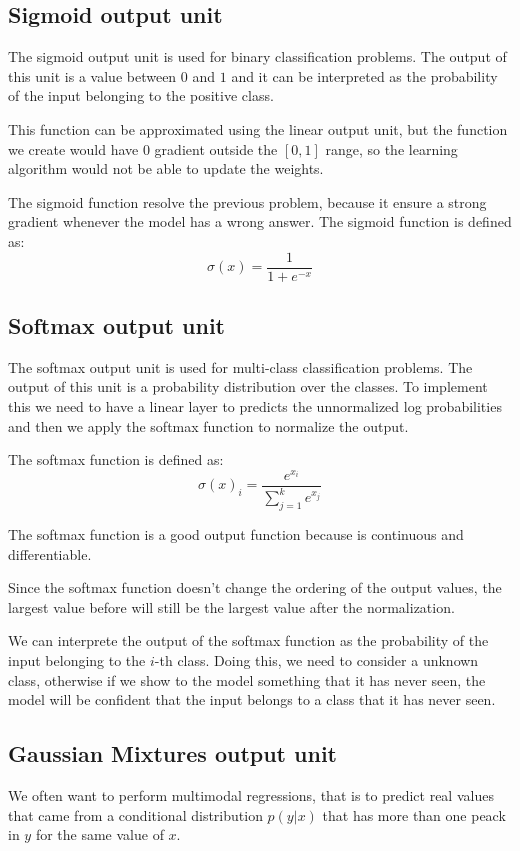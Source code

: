 \subsection{Sigmoid output unit}
The sigmoid output unit is used for binary classification problems. The output
of this unit is a value between $0$ and $1$ and it can be interpreted as the
probability of the input belonging to the positive class.

This function can be approximated using the linear output unit, but the function
we create would have 0 gradient outside the $[0, 1]$ range, so the learning
algorithm would not be able to update the weights.

The sigmoid function resolve the previous problem, because it ensure a strong
gradient whenever the model has a wrong answer. The sigmoid function is defined as:
\begin{equation}
    \sigma(x) = \frac{1}{1+e^{-x}}
\end{equation}
\subsection{Softmax output unit}
The softmax output unit is used for multi-class classification problems. The output
of this unit is a probability distribution over the classes. To implement this
we need to have a linear layer to predicts the unnormalized log probabilities and
then we apply the softmax function to normalize the output.

The softmax function is defined as:
\begin{equation}
    \sigma(x)_i = \frac{e^{x_i}}{\sum_{j=1}^k e^{x_j}}
\end{equation}

The softmax function is a good output function because is continuous and
differentiable.

Since the softmax function doesn't change the ordering of the output values, the
largest value before will still be the largest value after the normalization.

We can interprete the output of the softmax function as the probability of the
input belonging to the $i$-th class. Doing this, we need to consider a unknown
class, otherwise if we show to the model something that it has never seen, the
model will be confident that the input belongs to a class that it has never seen.
\subsection{Gaussian Mixtures output unit}
We often want to perform multimodal regressions, that is to predict real values
that came from a conditional distribution $p(y|x)$ that has more than one peack
in $y$ for the same value of $x$.

